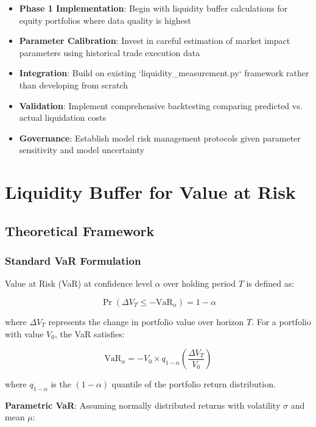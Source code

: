 \documentclass[11pt,a4paper]{article}
\begin{document}
\begin{itemize}
    \item \textbf{Phase 1 Implementation}: Begin with liquidity buffer calculations for equity portfolios where data quality is highest
    \item \textbf{Parameter Calibration}: Invest in careful estimation of market impact parameters using historical trade execution data
    \item \textbf{Integration}: Build on existing `liquidity\_measurement.py` framework rather than developing from scratch
    \item \textbf{Validation}: Implement comprehensive backtesting comparing predicted vs. actual liquidation costs
    \item \textbf{Governance}: Establish model risk management protocols given parameter sensitivity and model uncertainty
\end{itemize}

\section{Liquidity Buffer for Value at Risk}

\subsection{Theoretical Framework}

\subsubsection{Standard VaR Formulation}

Value at Risk (VaR) at confidence level $\alpha$ over holding period $T$ is defined as:

\begin{equation}
\Pr\left(\Delta V_T \leq -\text{VaR}_\alpha\right) = 1 - \alpha
\end{equation}

where $\Delta V_T$ represents the change in portfolio value over horizon $T$. For a portfolio with value $V_0$, the VaR satisfies:

\begin{equation}
\text{VaR}_\alpha = -V_0 \times q_{1-\alpha}\left(\frac{\Delta V_T}{V_0}\right)
\end{equation}

where $q_{1-\alpha}$ is the $(1-\alpha)$ quantile of the portfolio return distribution.

\textbf{Parametric VaR}: Assuming normally distributed returns with volatility $\sigma$ and mean $\mu$:
\end{document}
